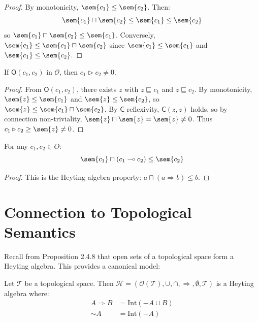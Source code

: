 \documentclass{itt-lean}
\begin{document}
\begin{proof}
	By monotonicity, $\sem{c_1} \leq \sem{c_2}$. Then:
	$$
	\sem{c_1} \sqcap \sem{c_2} \leq \sem{c_1} \leq \sem{c_2}
	$$
	so $\sem{c_1} \sqcap \sem{c_2} \leq \sem{c_1}$. Conversely, $\sem{c_1} \leq \sem{c_1} \sqcap \sem{c_2}$ since $\sem{c_1} \leq \sem{c_1}$ and $\sem{c_1} \leq \sem{c_2}$.
\end{proof}

\begin{teorema}
	If $\mathsf{O}(c_1, c_2)$ in $\mathcal{O}$, then $c_1 \triangleright c_2 \neq 0$.
\end{teorema}

\begin{proof}
	From $\mathsf{O}(c_1, c_2)$, there exists $z$ with $z \sqsubseteq c_1$ and $z \sqsubseteq c_2$. By monotonicity, $\sem{z} \leq \sem{c_1}$ and $\sem{z} \leq \sem{c_2}$, so $\sem{z} \leq \sem{c_1} \sqcap \sem{c_2}$. By $\mathsf{C}$-reflexivity, $\mathsf{C}(z, z)$ holds, so by connection non-triviality, $\sem{z} \sqcap \sem{z} = \sem{z} \neq 0$. Thus $c_1 \triangleright c_2 \geq \sem{z} \neq 0$.
\end{proof}

\begin{teorema}
	For any $c_1, c_2 \in O$:
	$$
	\sem{c_1} \sqcap (c_1 \multimap c_2) \leq \sem{c_2}
	$$
\end{teorema}

\begin{proof}
	This is the Heyting algebra property: $a \sqcap (a \Rightarrow b) \leq b$.
\end{proof}

\section{Connection to Topological Semantics}

Recall from Proposition 2.4.8 that open sets of a topological space form a Heyting algebra. This provides a canonical model:

\begin{proposicao}
	Let $\mathcal{T}$ be a topological space. Then $\mathcal{H} = (\mathcal{O}(\mathcal{T}), \cup, \cap, \Rightarrow, \emptyset, \mathcal{T})$ is a Heyting algebra where:
	\begin{align*}
		A \Rightarrow B &= \mathrm{Int}(-A \cup B) \\
		\sim A &= \mathrm{Int}(-A)
	\end{align*}
\end{proposicao}
\end{document}
